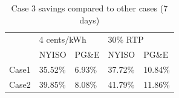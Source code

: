 \begin{table}[htb]
\caption{Case 3 savings compared to other cases (7 days)}
\label{tab:Cost_comp}
\centering
\begin{tabular}{l|l|l|l|l|}
\cline{2-5}
                            & \multicolumn{2}{l|}{4 cents/kWh} & \multicolumn{2}{l|}{30\% RTP}   \\ \cline{2-5} 
                            & NYISO           & PG\&E          & NYISO          & PG\&E          \\ \hline
\multicolumn{1}{|l|}{Case1} & 35.52\%         & 6.93\%         & 37.72\%        & 10.84\%        \\ \hline
\multicolumn{1}{|l|}{Case2} & 39.85\%         & 8.08\%         & 41.79\%        & 11.86\%        \\ \hline
\end{tabular}
\end{table}
